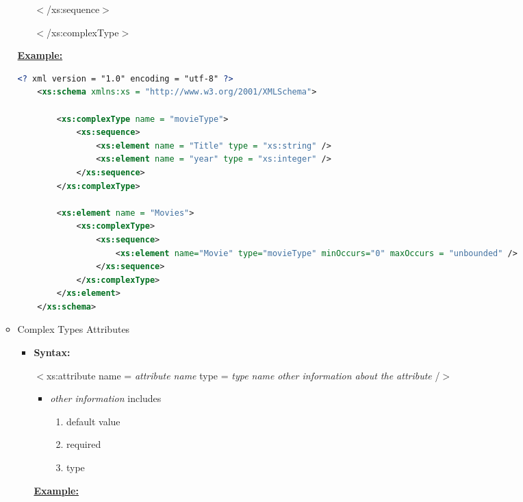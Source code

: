 \documentclass[12pt]{article}
\begin{document}
\begin{enumerate}[1.]
\begin{itemize}
\begin{itemize}
            \quad$<$/xs:sequence$>$

            $<$/xs:complexType$>$
        \end{itemize}

        \bigskip

        \underline{\textbf{Example:}}

        \bigskip

    \begin{lstlisting}[language=XML]
    <? xml version = "1.0" encoding = "utf-8" ?>
    <xs:schema xmlns:xs = "http://www.w3.org/2001/XMLSchema">

        <xs:complexType name = "movieType">
            <xs:sequence>
                <xs:element name = "Title" type = "xs:string" />
                <xs:element name = "year" type = "xs:integer" />
            </xs:sequence>
        </xs:complexType>

        <xs:element name = "Movies">
            <xs:complexType>
                <xs:sequence>
                    <xs:element name="Movie" type="movieType" minOccurs="0" maxOccurs = "unbounded" />
                </xs:sequence>
            </xs:complexType>
        </xs:element>
    </xs:schema>
    \end{lstlisting}

        \item Complex Types Attributes
        \begin{itemize}
            \item \textbf{Syntax:}

            $<$xs:attribute name = \textit{attribute name} type = \textit{type name} \textit{other information about the attribute} /$>$


            \bigskip

            \begin{itemize}
                \item \textit{other information} includes

                \begin{enumerate}[1.]
                    \item default value
                    \item required
                    \item type
                \end{enumerate}
            \end{itemize}


            \bigskip

            \underline{\textbf{Example:}}


\end{itemize}
\end{itemize}
\end{enumerate}
\end{document}
